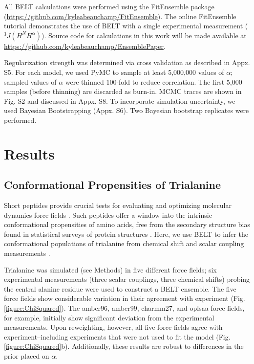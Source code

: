 \documentclass[11pt,titlepage]{article}
\begin{document}
All BELT calculations were performed using the FitEnsemble package (\url{https://github.com/kyleabeauchamp/FitEnsemble}).  The online FitEnsemble tutorial demonstrates the use of BELT with a single experimental measurement ($^3J(H^N H^\alpha)$).  Source code for calculations in this work will be made available at \url{https://github.com/kyleabeauchamp/EnsemblePaper}.  

Regularization strength was determined via cross validation as described in Appx. S5.  For each model, we used PyMC to sample at least 5,000,000 values of $\alpha$; sampled values of $\alpha$ were thinned 100-fold to reduce correlation.  The first 5,000 samples (before thinning) are discarded as burn-in.  MCMC traces are shown in Fig. S2 and discussed in Appx. S8.  To incorporate simulation uncertainty, we used Bayesian Bootstrapping (Appx. S6).  Two Bayesian bootstrap replicates were performed.  

\section*{Results}

\subsection*{Conformational Propensities of Trialanine}

Short peptides provide crucial tests for evaluating and optimizing molecular dynamics force fields  \citep{Graf2007,beauchamp2012protein, nerenberg2011, best2008, Grdadolnik2011}.  Such peptides offer a window into the intrinsic conformational propensities of amino acids, free from the secondary structure bias found in statistical surveys of protein structures  \citep{Jha2005}.  Here, we use BELT to infer the conformational populations of trialanine from chemical shift and scalar coupling measurements  \citep{Graf2007}.  

Trialanine was simulated (see Methods) in five different force fields; six experimental measurements (three scalar couplings, three chemical shifts) probing the central alanine residue were used to construct a BELT ensemble.  The five force fields show considerable variation in their agreement with experiment (Fig. \ref{figure:ChiSquared}).  The amber96, amber99, charmm27, and oplsaa force fields, for example, initially show significant deviation from the experimental measurements.  Upon reweighting, however, all five force fields agree with experiment--including experiments that were not used to fit the model (Fig. \ref{figure:ChiSquared}b).  Additionally, these results are robust to differences in the prior placed on $\alpha$.
\end{document}
